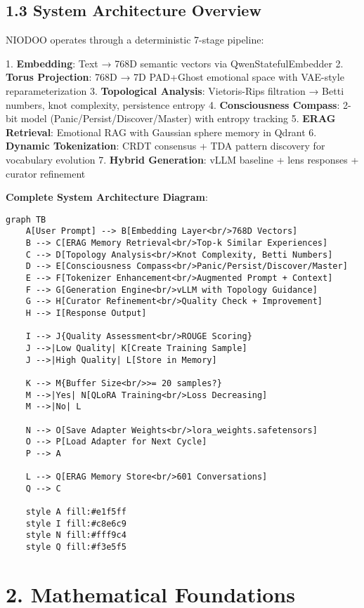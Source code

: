 \documentclass[11pt,a4paper]{article}
\begin{document}
\subsection{1.3 System Architecture Overview}

NIODOO operates through a deterministic 7-stage pipeline:

1. \textbf{Embedding}: Text → 768D semantic vectors via QwenStatefulEmbedder
2. \textbf{Torus Projection}: 768D → 7D PAD+Ghost emotional space with VAE-style reparameterization
3. \textbf{Topological Analysis}: Vietoris-Rips filtration → Betti numbers, knot complexity, persistence entropy
4. \textbf{Consciousness Compass}: 2-bit model (Panic/Persist/Discover/Master) with entropy tracking
5. \textbf{ERAG Retrieval}: Emotional RAG with Gaussian sphere memory in Qdrant
6. \textbf{Dynamic Tokenization}: CRDT consensus + TDA pattern discovery for vocabulary evolution
7. \textbf{Hybrid Generation}: vLLM baseline + lens responses + curator refinement

\textbf{Complete System Architecture Diagram}:

\begin{verbatim}graph TB
    A[User Prompt] --> B[Embedding Layer<br/>768D Vectors]
    B --> C[ERAG Memory Retrieval<br/>Top-k Similar Experiences]
    C --> D[Topology Analysis<br/>Knot Complexity, Betti Numbers]
    D --> E[Consciousness Compass<br/>Panic/Persist/Discover/Master]
    E --> F[Tokenizer Enhancement<br/>Augmented Prompt + Context]
    F --> G[Generation Engine<br/>vLLM with Topology Guidance]
    G --> H[Curator Refinement<br/>Quality Check + Improvement]
    H --> I[Response Output]
    
    I --> J{Quality Assessment<br/>ROUGE Scoring}
    J -->|Low Quality| K[Create Training Sample]
    J -->|High Quality| L[Store in Memory]
    
    K --> M{Buffer Size<br/>>= 20 samples?}
    M -->|Yes| N[QLoRA Training<br/>Loss Decreasing]
    M -->|No| L
    
    N --> O[Save Adapter Weights<br/>lora_weights.safetensors]
    O --> P[Load Adapter for Next Cycle]
    P --> A
    
    L --> Q[ERAG Memory Store<br/>601 Conversations]
    Q --> C
    
    style A fill:#e1f5ff
    style I fill:#c8e6c9
    style N fill:#fff9c4
    style Q fill:#f3e5f5
\end{verbatim}

\section{2. Mathematical Foundations}
\end{document}
